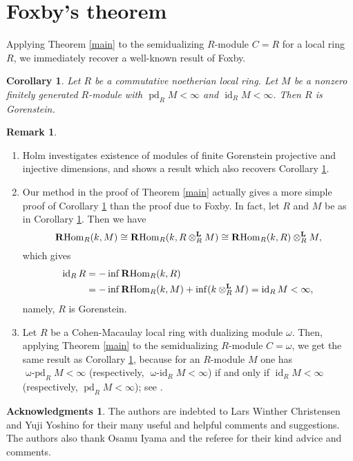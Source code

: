 \documentclass[a4, 10pt]{amsart}
\theoremstyle{plain}
\newtheorem{cor}[thm]{Corollary}
\theoremstyle{definition}
\newtheorem{rem}[thm]{Remark}
\newtheorem*{ac}{{\sc Acknowledgments}}
\theoremstyle{remark}
\def\RHom{\operatorname{{\bf R}Hom}}
\def\pd{\operatorname{pd}}
\def\id{\operatorname{id}}
\def\opd{\operatorname{\text{$\omega$}-pd}}
\def\oid{\operatorname{\text{$\omega$}-id}}
\begin{document}
\section{Foxby's theorem}

Applying Theorem \ref{main} to the semidualizing $R$-module $C=R$ for a local ring $R$, we immediately recover a well-known result of Foxby.

\begin{cor}\cite[(4.4)]{F}\label{cor}
Let $R$ be a commutative noetherian local ring.
Let $M$ be a nonzero finitely generated $R$-module with $\pd_RM<\infty$ and $\id_RM<\infty$.
Then $R$ is Gorenstein.
\end{cor}

\begin{rem}
\begin{enumerate}[\rm (1)]
\item
Holm \cite{H} investigates existence of modules of finite Gorenstein projective and injective dimensions, and shows a result which also recovers Corollary \ref{cor}.
\item
Our method in the proof of Theorem \ref{main} actually gives a more simple proof of Corollary \ref{cor} than the proof due to Foxby.
In fact, let $R$ and $M$ be as in Corollary \ref{cor}.
Then we have
$$
\RHom_R(k,M)\cong\RHom_R(k,R\otimes_R^{\bf L}M)\cong\RHom_R(k,R)\otimes_R^{\bf L}M,
$$
which gives
\begin{align*}
\id_RR & =-\inf\RHom_R(k,R)\\
& =-\inf\RHom_R(k,M)+\inf(k\otimes_R^{\bf L}M)=\id_RM<\infty,
\end{align*}
namely, $R$ is Gorenstein.
\item
Let $R$ be a Cohen-Macaulay local ring with dualizing module $\omega$.
Then, applying Theorem \ref{main} to the semidualizing $R$-module $C=\omega$, we get the same result as Corollary \ref{cor}, because for an $R$-module $M$ one has $\opd_RM<\infty$ (respectively, $\oid_RM<\infty$) if and only if $\id_RM<\infty$ (respectively, $\pd_RM<\infty$); see \cite[(2.11)]{cdim}.
\end{enumerate}
\end{rem}

\begin{ac}
The authors are indebted to Lars Winther Christensen and Yuji Yoshino for their many useful and helpful comments and suggestions.
The authors also thank Osamu Iyama and the referee for their kind advice and comments.

\end{ac}
\end{document}
